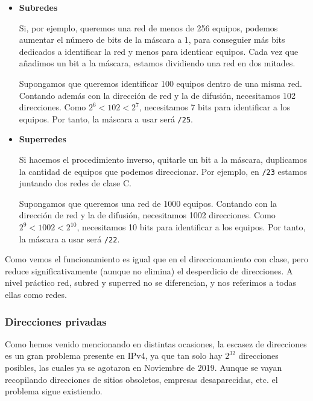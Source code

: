 \begin{itemize}
    \item \textbf{Subredes}\

    Si, por ejemplo, queremos una red de menos de 256 equipos, podemos aumentar el número de bits de la máscara a $1$, para conseguier más bits dedicados a identificar la red y menos para identicar equipos. Cada vez que añadimos un bit a la máscara, estamos dividiendo una red en dos mitades. 
    \begin{ejemplo}
        Supongamos que queremos identificar 100 equipos dentro de una misma red. Contando además con la dirección de red y la de difusión, necesitamos 102 direcciones. Como $2^6<102<2^7$, necesitamos 7 bits para identificar a los equipos. Por tanto, la máscara a usar será \verb|/25|.
    \end{ejemplo}
        \item \textbf{Superredes}\

            Si hacemos el procedimiento inverso, quitarle un bit a la máscara, duplicamos la cantidad de equipos que podemos direccionar. Por ejemplo, en \verb|/23| estamos juntando dos redes de clase C. 
    \begin{ejemplo}
        Supongamos que queremos una red de 1000 equipos. Contando con la dirección de red y la de difusión, necesitamos 1002 direcciones. Como $2^9<1002<2^{10}$, necesitamos 10 bits para identificar a los equipos. Por tanto, la máscara a usar será \verb|/22|.
    \end{ejemplo}
\end{itemize}


Como vemos el funcionamiento es igual que en el direccionamiento con clase, pero reduce significativamente (aunque no elimina) el desperdicio de direcciones. A nivel práctico red, subred y superred no se diferencian, y nos referimos a todas ellas como redes.




\subsubsection{Direcciones privadas}

Como hemos venido mencionando en distintas ocasiones, la escasez de direcciones es un gran problema presente en \acrshort{IPv4}, ya que tan solo hay $2^{32}$ direcciones posibles, las cuales ya se agotaron en Noviembre de 2019. Aunque se vayan recopilando direcciones de sitios obsoletos, empresas desaparecidas, etc. el problema sigue existiendo.\\

